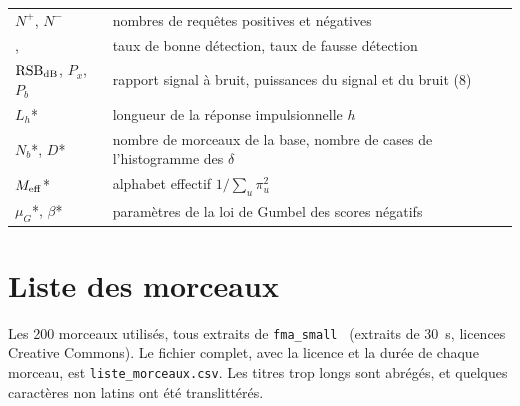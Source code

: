 \begin{center}
\begin{tabularx}{\linewidth}{@{}lX@{}}
  $N^+$, $N^-$ & nombres de requêtes positives et négatives \\
  \TBD{}, \TFD{} & taux de bonne détection, taux de fausse détection \\
  $\mathrm{RSB}_{\mathrm{dB}}$, $P_x$, $P_b$ & rapport signal à bruit, puissances du signal et du bruit (8) \\
  $L_h$* & longueur de la réponse impulsionnelle $h$ \\
  $N_b$*, $D$* & nombre de morceaux de la base, nombre de cases de l'histogramme des $\delta$ \\
  $M_{\mathrm{eff}}$* & alphabet effectif $1/\sum_u \pi_u^2$ \\
  $\mu_G$*, $\beta$* & paramètres de la loi de Gumbel des scores négatifs \\
  \bottomrule
\end{tabularx}
\end{center}

\section{Liste des morceaux}
\label{sec-liste-morceaux}

Les 200 morceaux utilisés, tous extraits de \texttt{fma\_small}~\cite{fma2017} (extraits de
\qty{30}{\second}, licences Creative Commons). Le fichier complet, avec la licence et la durée
de chaque morceau, est \texttt{liste\_morceaux.csv}. Les titres trop longs sont abrégés, et
quelques caractères non latins ont été translittérés.


